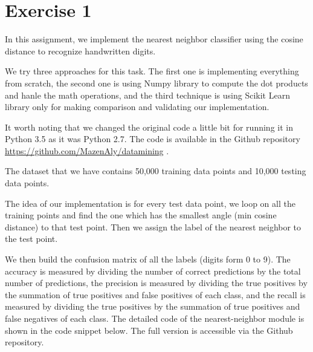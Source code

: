 \section*{Exercise 1}
In this assignment, we implement the nearest neighbor classifier using the cosine distance to recognize handwritten digits. 

We try three approaches for this task. The first one is implementing everything from scratch, the second one is using Numpy library to compute the dot products and hanle the math operations, and the third technique is using Scikit Learn library only for making comparison and validating our implementation.

It worth noting that we changed the original code a little bit for running it in Python 3.5 as it was Python 2.7. The code is available in the Github repository \url{https://github.com/MazenAly/datamining} .

The dataset that we have contains 50,000 training data points and 10,000 testing data points.

The idea of our implementation is for every 
test data point, we loop on all the training points and find the one which has the smallest angle (min cosine distance) to that test point. Then we assign the label of the nearest neighbor to the test point.

We then build the confusion matrix of all the labels (digits form 0 to 9). The accuracy is measured by dividing the number of correct predictions by the total number of predictions, the precision is measured by dividing the true positives by the summation of true positives and false positives of each class, and the recall is measured by dividing the true positives by the summation of true positives and false negatives of each class. The detailed code of the nearest-neighbor module is shown in the code snippet below. The full version is accessible via the Github repository.

